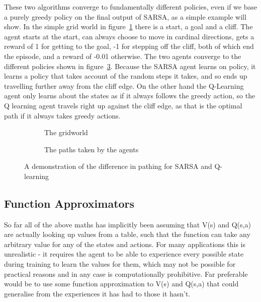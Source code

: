 These two algorithms converge to fundamentally different policies, even if we base a purely greedy policy on the final output of SARSA, as a simple example will show. In the simple grid world in figure~\ref{fig:gridworld} there is a start, a goal and a cliff. The agent starts at the start, can always choose to move in cardinal directions, gets a reward of 1 for getting to the goal, -1 for stepping off the cliff, both of which end the episode, and  a reward of -0.01 otherwise. The two agents converge to the different policies shown in figure~\ref{fig:gridworldpaths}. Because the SARSA agent learns on policy, it learns a policy that takes account of the random steps it takes, and so ends up travelling further away from the cliff edge. On the other hand the Q-Learning agent only learns about the states as if it always follows the greedy action, so the Q learning agent travels right up against the cliff edge, as that is the optimal path if it always takes greedy actions.

\begin{figure}
\begin{subfigure}{0.5\textwidth}

\caption{The gridworld}
\label{fig:gridworld}
\end{subfigure}
\begin{subfigure}{0.5\textwidth}

\caption{The paths taken by the agents}
\label{fig:gridworldpaths}
\end{subfigure}
\caption{A demonstration of the difference in pathing for SARSA and Q-learning}
\end{figure}

\subsection{Function Approximators}
So far all of the above maths has implicitly been assuming that V(s) and Q(s,a) are actually looking up values from a table, such that the function can take any arbitrary value for any of the states and actions. For many applications this is unrealistic - it requires the agent to be able to experience every possible state during training to learn the values for them, which may not be possible for practical reasons and in any case is computationally prohibitive. Far preferable would be to use some function approximation to V(s) and Q(s,a) that could generalise from the experiences it has had to those it hasn't.

